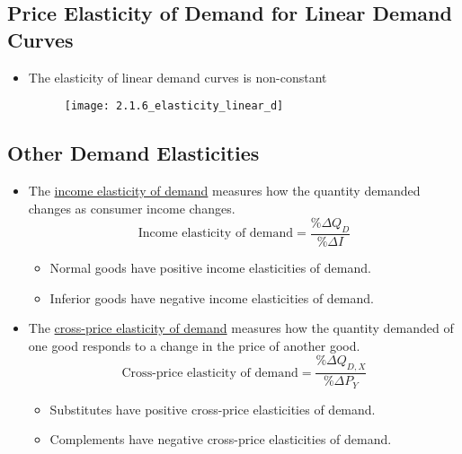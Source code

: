 \newpage



\subsection{Price Elasticity of Demand for Linear Demand Curves}

\begin{itemize}

\item The elasticity of linear demand curves is non-constant

\begin{figure}[ht]
\centering
\texttt{[image: 2.1.6\_elasticity\_linear\_d]}
\end{figure}

\end{itemize}



\subsection{Other Demand Elasticities}

\begin{itemize}

\item The \underline{income elasticity of demand} measures how the quantity demanded changes as consumer income changes.
	\[\text{Income elasticity of demand} = \frac{\% \Delta Q_D}{\% \Delta I} \]
	
	\begin{itemize}
	
	\item Normal goods have positive income elasticities of demand.
	
	\item Inferior goods have negative income elasticities of demand.
	
	\end{itemize}
	
\item The \underline{cross-price elasticity of demand} measures how the quantity demanded of one good responds to a change in the price of another good.
	\[ \text{Cross-price elasticity of demand} = \frac{\% \Delta Q_{D,X}}{\% \Delta P_Y} \]
	
	\begin{itemize}
	
	\item Substitutes have positive cross-price elasticities of demand.
	
	\item Complements have negative cross-price elasticities of demand.
	
	\end{itemize}
	
\end{itemize}



